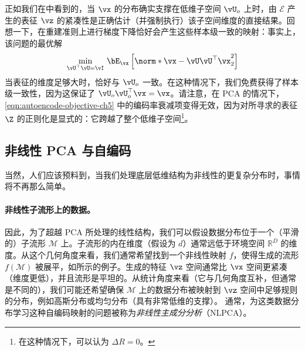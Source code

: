 \documentclass[../../book-main_zh.tex]{subfiles}
\begin{document}
正如我们在中看到的，当 $\vx$ 的分布确实支撑在低维子空间 $\vU_o$ 上时，由 $\mathcal{E}$ 产生的表征 $\vz$ 的紧凑性是正确估计（并强制执行）该子空间维度的直接结果。回想一下，在重建准则上进行梯度下降恰好会产生这些样本级一致的映射：事实上，该问题的最优解
\begin{equation}\label{eq:pca-reconstruction-ch5}
    \min_{\vU^\top \vU = \vI}\, \bE_{\vx}\left[\norm*{\vx
    - \vU\vU^\top \vx}_2^2\right]
\end{equation}
当表征的维度足够大时，恰好与 $\vU_o$ 一致。在这种情况下，我们免费获得了样本级一致性，因为这保证了 $\vU_o\vU_o^\top \vx = \vx$。请注意，在 PCA 的情况下，\eqref{eqn:autoencode-objective-ch5} 中的编码率衰减项变得无效，因为对所寻求的表征 $\Z$ 的正则化是显式的：它跨越了整个低维子空间\footnote{在这种情况下，可以认为 $\Delta R = 0$。}。

\subsection{非线性 PCA 与自编码}\label{sub:nonlinear-pca}\label{sec:NLPCA}
当然，人们应该预料到，当我们处理底层低维结构为非线性的更复杂分布时，事情将不再那么简单。

\paragraph{非线性子流形上的数据。} 因此，为了超越 PCA 所处理的线性结构，我们可以假设数据分布位于一个（平滑的）子流形 $\mathcal{M}$ 上。子流形的内在维度（假设为 $d$）通常远低于环境空间 $\mathbb{R}^D$ 的维度。从这个几何角度来看，我们通常希望找到一个非线性映射 $f$，使得生成的流形 $f(\mathcal{M})$ 被展平，如所示的例子。生成的特征 $\vz$ 空间通常比 $\vx$ 空间更紧凑（维度更低），并且流形是平坦的。从统计角度来看（它与几何角度互补，但通常是不同的），我们可能还希望确保 $\mathcal{M}$ 上的数据分布被映射到 $\vz$ 空间中足够规则的分布，例如高斯分布或均匀分布（具有非常低维的支撑）。
通常，为这类数据分布学习这种自编码映射的问题被称为{\em 非线性主成分分析}（NLPCA）。
\end{document}
